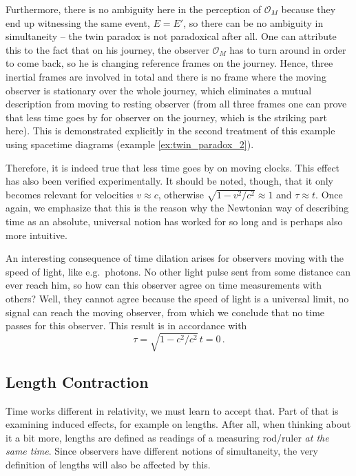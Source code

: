 \begin{ex}
	Furthermore, there is no ambiguity here in the perception of $\mathcal{O}_M$ because they end up witnessing the same event, $E = E'$, so there can be no ambiguity in simultaneity -- the twin paradox is not paradoxical after all. One can attribute this to the fact that on his journey, the observer $\mathcal{O}_M$ has to turn around in order to come back, so he is changing reference frames on the journey. Hence, three inertial frames are involved in total and there is no frame where the moving observer is stationary over the whole journey, which eliminates a mutual description from moving to resting observer (from all three frames one can prove that less time goes by for observer on the journey, which is the striking part here). This is demonstrated explicitly in the second treatment of this example using spacetime diagrams (example \ref{ex:twin_paradox_2}).
\end{ex}
Therefore, it is indeed true that less time goes by on moving clocks. This effect has also been verified experimentally. It should be noted, though, that it only becomes relevant for velocities $v \approx c$, otherwise $\sqrt{1 - v^2 / c^2} \approx 1$ and $\tau \approx t$. Once again, we emphasize that this is the reason why the Newtonian way of describing time as an absolute, universal notion has worked for so long and is perhaps also more intuitive.


An interesting consequence of time dilation arises for observers moving with the speed of light, like e.g.~photons. No other light pulse sent from some distance can ever reach him, so how can this observer agree on time measurements with others? Well, they cannot agree because the speed of light is a universal limit, no signal can reach the moving observer, from which we conclude that no time passes for this observer. This result is in accordance with
\begin{equation}
	\tau = \sqrt{1 - c^2 / c^2} \, t = 0 \, .
\end{equation}



		\subsection{Length Contraction}
Time works different in relativity, we must learn to accept that. Part of that is examining induced effects, for example on lengths. After all, when thinking about it a bit more, lengths are defined as readings of a measuring rod/ruler \emph{at the same time}. Since observers have different notions of simultaneity, the very definition of lengths will also be affected by this.


